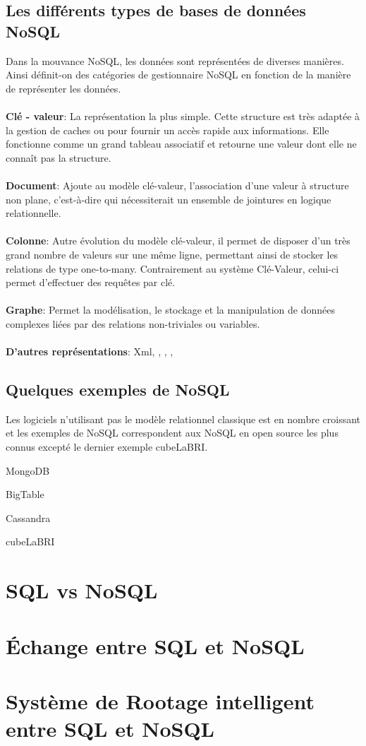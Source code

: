 \subsection{Les différents types de bases de données \textsf{NoSQL}} 
 
Dans la mouvance \textsf{NoSQL}, les données sont représentées de
diverses manières. Ainsi définit-on des catégories de gestionnaire
\textsf{NoSQL} en fonction de la manière de représenter les données.
\\\\ 
\textbf{Clé - valeur}: La représentation la plus simple. Cette
structure est très adaptée à la gestion de caches ou pour fournir un
accès rapide aux informations. Elle fonctionne comme un grand tableau
associatif et retourne une valeur dont elle ne connaît pas la
structure.  
\\\\ 
{\bf Document}: Ajoute au modèle clé-valeur,
l’association d’une valeur à structure non plane, c’est-à-dire qui
nécessiterait un ensemble de jointures en logique relationnelle.
\\\\ 
{\bf Colonne}: Autre évolution du modèle clé-valeur, il permet de
disposer d'un très grand nombre de valeurs sur une même ligne,
permettant ainsi de stocker les relations de type one-to-many. 
Contrairement au système Clé-Valeur, celui-ci permet
d’effectuer des requêtes par clé.
\\\\
{\bf Graphe}: Permet la modélisation, le stockage et la manipulation de données
complexes liées par des relations non-triviales ou variables.
\\
\\
\textbf{D'autres représentations}: \textsf{Xml}, \textsf{}, \textsf{}, \textsf{}, 

\subsection{Quelques exemples de \textsf{NoSQL}}

Les logiciels n'utilisant pas le modèle relationnel classique est en
nombre croissant et les exemples de \textsf{NoSQL} correspondent aux
\textsf{NoSQL} en open source les plus connus excepté le dernier
exemple \textsf{cubeLaBRI}.

{\sf MongoDB}    

\textsf{BigTable}    

\textsf{Cassandra}

\textsf{cubeLaBRI}    

\section{\sf SQL vs NoSQL}

\section{Échange entre \textsf{SQL} et \textsf{NoSQL}}

\section{Système de Rootage intelligent entre {\sf SQL} et {\sf NoSQL}}
